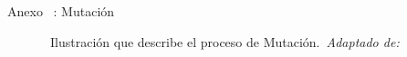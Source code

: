 \begin{frame}{Anexo \thesection~: Mutación}%
    \vspace{-0.15cm}
    \begin{figure}[H]
        \centering
        \vspace{-0.25cm}
        \caption{\tiny~Ilustración que describe el proceso de Mutación.~\textit{Adaptado de:}~\cite{CarlesBou2023}}%
        \label{fig:tournament_selection}
    \end{figure}
\end{frame}